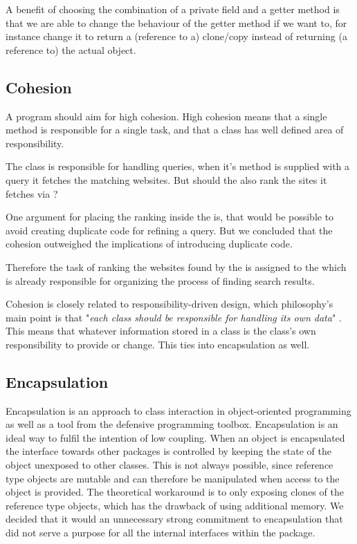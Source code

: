 A benefit of choosing the combination of a private field and a getter method is that we are able to change the behaviour of the getter method if we want to, for instance change it to return a (reference to a) clone/copy instead of returning (a reference to) the actual object. 


\subsection{Cohesion}
A program should aim for high cohesion. %
High cohesion means that a single method is responsible for a single task, and that a class has well defined area of responsibility. 

The class  is responsible for handling queries, when it's method  is supplied with a query it fetches the matching websites. But should the  also rank the sites it fetches via ? 

One argument for placing the ranking inside the  is, that would be possible to avoid creating duplicate code for refining a query. But we concluded that the cohesion outweighed the implications of introducing duplicate code.

Therefore the task of ranking the websites found by the  is assigned to the   which is already responsible for organizing the process of finding search results.

Cohesion is closely related to responsibility-driven design, which philosophy's main point is that "\textit{each class should be responsible for handling its own data}" \cite[270]{BK}. This means that whatever information stored in a class is the class's own responsibility to provide or change. This ties into encapsulation as well. %

\subsection{Encapsulation}
Encapsulation is an approach to class interaction in object-oriented programming as well as a tool from the defensive programming toolbox. Encapsulation is an ideal way to fulfil the intention of low coupling. When an object is encapsulated the interface towards other packages is controlled by keeping the state of the object unexposed to other classes. This is not always possible, since reference type objects are mutable and can therefore be manipulated when access to the object is provided. The theoretical workaround is to only exposing clones of the reference type objects, which has the drawback of using additional memory. We decided that it would an unnecessary strong commitment to encapsulation that did not serve a purpose for all the internal interfaces within the  package.

